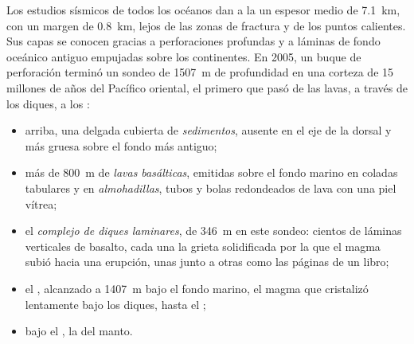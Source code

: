 Los estudios sísmicos de todos los océanos dan a la  un
espesor medio de \qty{7.1}{km}, con un margen de \qty{0.8}{km}, lejos de las
zonas de fractura y de los puntos calientes. Sus capas se conocen gracias a
perforaciones profundas y a láminas de fondo oceánico antiguo empujadas sobre
los continentes. En 2005, un buque de perforación terminó un sondeo de
\qty{1507}{m} de profundidad en una corteza de 15 millones de años del
Pacífico oriental, el primero que pasó de las lavas, a través de los diques,
a los :

\begin{itemize}
  \item arriba, una delgada cubierta de \emph{sedimentos}, ausente en el eje
        de la dorsal y más gruesa sobre el fondo más antiguo;
  \item más de \qty{800}{m} de \emph{lavas basálticas}, emitidas sobre el
        fondo marino en coladas tabulares y en \emph{almohadillas}, tubos y
        bolas redondeados de lava con una piel vítrea;
  \item el \emph{complejo de diques laminares}, de \qty{346}{m} en este
        sondeo: cientos de láminas verticales de basalto, cada una la grieta
        solidificada por la que el magma subió hacia una erupción, unas junto
        a otras como las páginas de un libro;
  \item el \emph{}, alcanzado a \qty{1407}{m} bajo el fondo marino, el
        magma que cristalizó lentamente bajo los diques, hasta el ;
  \item bajo el , la \emph{} del manto.
\end{itemize}

